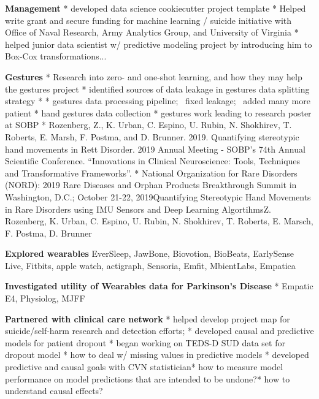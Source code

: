 \begin{itemize*}
  \item\leftandright
    {\textbf{Management}}
    * developed data science cookiecutter project template
    * Helped write grant and secure funding for machine learning / suicide
    initiative with Office of Naval Research, Army Analytics Group, and
    University of Virginia
    * helped junior data scientist w/ predictive modeling project by
    introducing him to Box-Cox transformations...
  \item\leftandright
    {\textbf{Gestures}}
    * Research into zero- and one-shot learning, and how they may help the
    gestures project
    * identified sources of data leakage in gestures data splitting
    strategy
    * * gestures data processing pipeline;  fixed leakage;  added many
    more patient
    * hand gestures data collection
    * gestures work leading to research poster at SOBP
    * Rozenberg, Z., K. Urban, C. Espino, U. Rubin, N. Shokhirev, T.
      Roberts, E. Marsh, F. Postma, and D. Brunner. 2019. Quantifying
      stereotypic hand movements in Rett Disorder. 2019 Annual Meeting -
      SOBP’s 74th Annual Scientific Conference. “Innovations in Clinical
      Neuroscience: Tools, Techniques and Transformative Frameworks”.
    * National Organization for Rare
      Disorders (NORD): 2019 Rare Diseases and Orphan Products
      Breakthrough Summit in Washington, D.C.; October 21-22,
      2019Quantifying Stereotypic Hand Movements in Rare Disorders using
      IMU Sensors and Deep Learning AlgortihmsZ. Rozenberg, K. Urban, C.
      Espino, U. Rubin, N. Shokhirev, T. Roberts, E. Marsch, F. Postma, D.
      Brunner

  \item\leftandright
    {\textbf{Explored wearables}}
    EverSleep, JawBone, Biovotion, BioBeats, EarlySense Live, Fitbits,
    apple watch, actigraph, Sensoria, Emfit, MbientLabs, Empatica
  \item\leftandright
    {\textbf{Investigated utility of Wearables data for Parkinson's
    Disease}}
    * Empatic E4, Physiolog, MJFF
  \item\leftandright
    {\textbf{Partnered with clinical care network}}
    * helped develop project map for suicide/self-harm research and detection
    efforts; * developed causal and predictive models for patient
    dropout
    * began working on TEDS-D SUD data set for dropout model
    * how to deal w/ missing values in predictive models
    * developed predictive and causal goals with CVN statistician* how
    to measure model performance on model predictions that are intended
    to be undone?* how to understand causal effects?


\end{itemize*}

